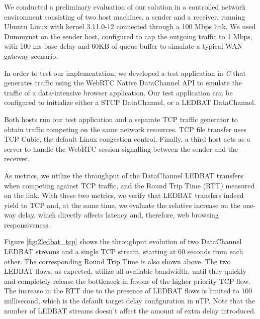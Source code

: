 \documentclass{sig-alternate}
\begin{document}
\label{sec:architecture}


We conducted a preliminary evaluation of our solution in a controlled network environment
consisting of two host machines, a sender and a receiver, running Ubuntu Linux with kernel
3.11.0-12 connected through a 100 Mbps link. We used Dummynet on the sender host,
configured to cap the outgoing traffic to 1 Mbps, with 100 ms base delay and 60KB of queue
buffer to simulate a typical WAN gateway scenario. 

In order to test our implementation, we developed a test application in \textit{C} that
generates traffic using the WebRTC Native DataChannel API to emulate the traffic
of a data-intensive browser application. Our test application can be configured
to initialize either a STCP DataChannel, or a LEDBAT DataChannel.

Both hosts run our test application and a separate TCP traffic generator to obtain traffic
competing on the same network resources. TCP file transfer uses TCP Cubic, the default
Linux congestion control. Finally, a third host acts as a server to handle the WebRTC
session signalling between the sender and the receiver.

As metrics, we utilize the throughput of the DataChannel LEDBAT transfers when competing
against TCP traffic, and the Round Trip Time (RTT) measured on the link. With these two
metrics, we verify that LEDBAT transfers indeed yield to TCP and, at the same time, we
evaluate the relative increase on the one-way delay, which directly affects latency and,
therefore, web browsing responsiveness.

Figure \ref{fig:2ledbat_tcp} shows the throughput evolution of two DataChannel LEDBAT
streams and a single TCP stream, starting at 60 seconds from each other. The corresponding
Round Trip Time is also shown above. The two LEDBAT flows, as expected, utilize all
available bandwidth, until they quickly and completely release the bottleneck in favour of
the higher priority TCP flow. The increase in the RTT due to the presence of LEDBAT flows
is limited to 100 millisecond, which is the default target delay configuration in
uTP. Note that the number of LEDBAT streams doesn't affect the amount of extra delay
introduced.

\end{document}
